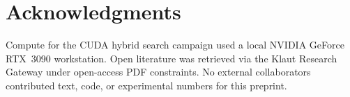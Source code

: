 \section*{Acknowledgments}
\label{sec:acknowledgments}

Compute for the CUDA hybrid search campaign used a local NVIDIA GeForce RTX~3090 workstation.
Open literature was retrieved via the Klaut Research Gateway under open-access PDF constraints.
No external collaborators contributed text, code, or experimental numbers for this preprint.
